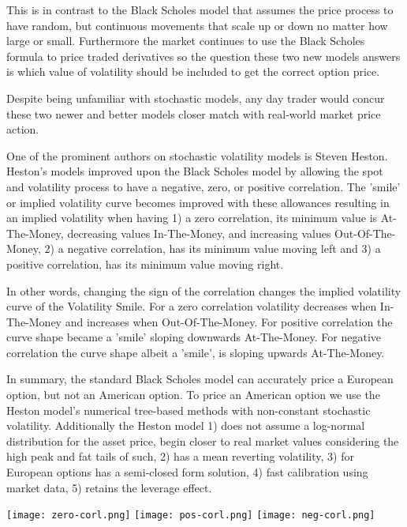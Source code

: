 \documentclass{article}
\begin{document}
This is in contrast to the Black Scholes model that assumes the price process to have random, but continuous movements that scale up or down no matter how large or small. Furthermore the market continues to use the Black Scholes formula to price traded derivatives so the question these two new models answers is which value of volatility should be included to get the correct option price.
\cite{jumpP}

Despite being unfamiliar with stochastic models, any day trader would concur these two newer and better models closer match with real-world market price action.  

One of the prominent authors on stochastic volatility models is Steven Heston.  Heston's models improved upon the Black Scholes model by allowing the spot and volatility process to have a negative, zero, or positive correlation.  The 'smile' or implied volatility curve becomes improved with these allowances resulting in an implied volatility when having 1) a zero correlation, its minimum value is At-The-Money, decreasing values In-The-Money, and increasing values Out-Of-The-Money, 2) a negative correlation, has its minimum value moving left and 3) a positive correlation, has its minimum value moving right.

In other words, changing the sign of the correlation changes the implied volatility curve of the Volatility Smile.  For a zero correlation volatility decreases when In-The-Money and increases when Out-Of-The-Money.  For positive correlation the curve shape became a 'smile' sloping downwards At-The-Money.  For negative correlation the curve shape albeit a 'smile', is sloping upwards At-The-Money.

In summary, the standard Black Scholes model can accurately price a European option, but not an American option. To price an American option we use the Heston model's numerical tree-based methods with non-constant stochastic volatility.
Additionally the Heston model 1) does not assume a log-normal distribution for the asset price, begin closer to real market values considering the high peak and fat tails of such, 2) has a mean reverting volatility, 3) for European options has a semi-closed form solution, 4) fast calibration using market data, 5) retains the leverage effect.
\cite{tree}

\newpage
\begin{center}
\texttt{[image: zero-corl.png]}
\texttt{[image: pos-corl.png]} 
\texttt{[image: neg-corl.png]}
\end{center}
\end{document}
